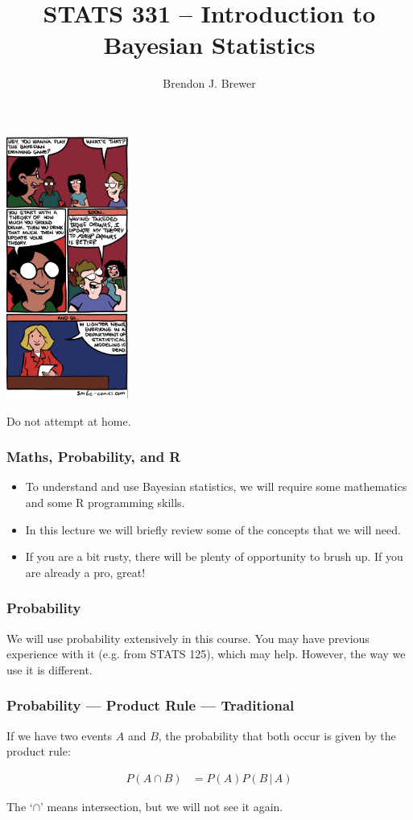 \documentclass{beamer}
\author{Brendon J. Brewer}
\title{STATS 331 -- Introduction to Bayesian Statistics}
\institute{The University of Auckland}
\date{}
\newcommand{\given}{\,|\,}
\begin{document}
\frame{\titlepage}

\begin{frame}
\begin{center}
\includegraphics[width=0.3\textwidth]{images/drinking_game.png}
\end{center}

Do not attempt at home.

\end{frame}

\begin{frame}
\frametitle{Maths, Probability, and R}

\begin{itemize}
\item To understand and use Bayesian statistics, we will
require some mathematics and some R programming
skills.\pause
\item  In this lecture we will briefly review some of the concepts
that we will need.\pause
\item If you are a bit rusty, there will be plenty of opportunity to
brush up. If you are already a pro, great!
\end{itemize}

\end{frame}


\begin{frame}
\frametitle{Probability}
We will use probability extensively in this course. You may have previous
experience with it (e.g. from STATS 125), which may help. However, the way we
use it is different.



\end{frame}


\begin{frame}
\frametitle{Probability --- Product Rule --- Traditional}
If we have two {\color{red} events} $A$ and $B$, the probability that both
{\color{red} occur} is given by the product rule:

\begin{align}
P(A \cap B) &= P(A)P(B \given A)
\end{align}

The `$\cap$' means intersection, but we will not see it again.



\end{frame}
\end{document}
